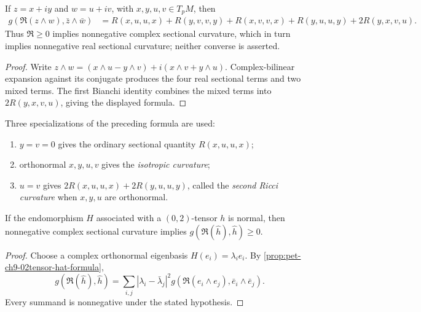 \begin{lemma}
  \label{lem:pet-ch9-complex-sectional-curvature-real-formula}
  If $z=x+iy$ and $w=u+iv$, with $x,y,u,v\in T_pM$, then
  \begin{align*}
    g(\mathfrak{R}(z\wedge w),\bar z\wedge\bar w)
    &=R(x,u,u,x)+R(y,v,v,y)+R(x,v,v,x)+R(y,u,u,y)+2R(y,x,v,u).
  \end{align*}
  Thus $\mathfrak R\ge0$ implies nonnegative complex sectional curvature,
  which in turn implies nonnegative real sectional curvature; neither
  converse is asserted.
\end{lemma}
\begin{proof}
  \sketch
  Write
  \(z\wedge w=(x\wedge u-y\wedge v)+i(x\wedge v+y\wedge u)\).
  Complex-bilinear expansion against its conjugate produces the four real
  sectional terms and two mixed terms.  The first Bianchi identity combines
  the mixed terms into \(2R(y,x,v,u)\), giving the displayed formula.
\end{proof}

\begin{remark}
  \label{rem:pet-ch9-complex-sectional-curvature-special-cases}
  Three specializations of the preceding formula are used:
  \begin{enumerate}
    \item $y=v=0$ gives the ordinary sectional quantity $R(x,u,u,x)$;
    \item orthonormal $x,y,u,v$ gives the \emph{isotropic curvature};
    \item $u=v$ gives $2R(x,u,u,x)+2R(y,u,u,y)$, called the
      \emph{second Ricci curvature} when $x,y,u$ are orthonormal.
  \end{enumerate}
\end{remark}

\begin{proposition}
  \label{prop:pet-ch9-normal-tensor-nonneg-complex-sectional}
  If the endomorphism $H$ associated with a $(0,2)$-tensor $h$ is normal, then
  nonnegative complex sectional curvature implies
  $g(\mathfrak R(\hat h),\hat h)\ge0$.
\end{proposition}
\begin{proof}
  \sketch
  Choose a complex orthonormal eigenbasis \(H(e_i)=\lambda_ie_i\).  By
  \cref{prop:pet-ch9-02tensor-hat-formula},
  \[
    g(\mathfrak R(\hat h),\hat h)
      =\sum_{i,j}|\lambda_i-\bar\lambda_j|^2
        g(\mathfrak R(e_i\wedge e_j),\bar e_i\wedge\bar e_j).
  \]
  Every summand is nonnegative under the stated hypothesis.
\end{proof}

